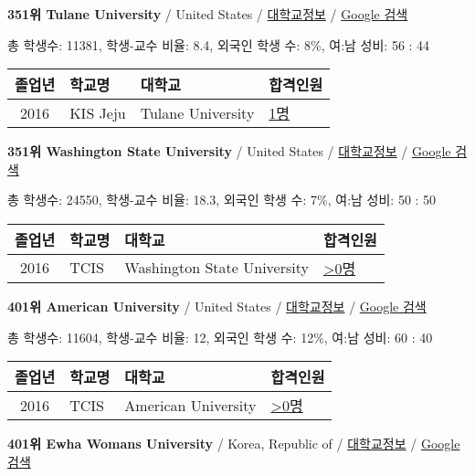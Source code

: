 \documentclass[13pt,]{article}
\begin{document}
\textbf{351위 Tulane University} / United States /
\href{https://www.timeshighereducation.com/world-university-rankings/tulane-university?ranking-dataset=589595}{대학교정보}
/ \href{http://www.google.com/search?q=Tulane+University}{Google 검색}

총 학생수: 11381, 학생-교수 비율: 8.4, 외국인 학생 수: 8\%, 여:남 성비:
56 : 44

\begin{longtable}[]{@{}clll@{}}
\toprule
졸업년 & 학교명 & 대학교 & 합격인원\tabularnewline
\midrule
\endhead
2016 & KIS Jeju & Tulane University &
\href{http://cafe.naver.com/assarabia/11596}{1명}\tabularnewline
\bottomrule
\end{longtable}

\textbf{351위 Washington State University} / United States /
\href{https://www.timeshighereducation.com/world-university-rankings/washington-state-university?ranking-dataset=589595}{대학교정보}
/
\href{http://www.google.com/search?q=Washington+State+University}{Google
검색}

총 학생수: 24550, 학생-교수 비율: 18.3, 외국인 학생 수: 7\%, 여:남 성비:
50 : 50

\begin{longtable}[]{@{}clll@{}}
\toprule
졸업년 & 학교명 & 대학교 & 합격인원\tabularnewline
\midrule
\endhead
2016 & TCIS & Washington State University &
\href{http://cafe.naver.com/assarabia/11598}{\textgreater{}0명}\tabularnewline
\bottomrule
\end{longtable}

\textbf{401위 American University} / United States /
\href{https://www.timeshighereducation.com/world-university-rankings/american-university?ranking-dataset=589595}{대학교정보}
/ \href{http://www.google.com/search?q=American+University}{Google 검색}

총 학생수: 11604, 학생-교수 비율: 12, 외국인 학생 수: 12\%, 여:남 성비:
60 : 40

\begin{longtable}[]{@{}clll@{}}
\toprule
졸업년 & 학교명 & 대학교 & 합격인원\tabularnewline
\midrule
\endhead
2016 & TCIS & American University &
\href{http://cafe.naver.com/assarabia/11598}{\textgreater{}0명}\tabularnewline
\bottomrule
\end{longtable}

\textbf{401위 Ewha Womans University} / Korea, Republic of /
\href{https://www.timeshighereducation.com/world-university-rankings/ewha-womans-university?ranking-dataset=589595}{대학교정보}
/ \href{http://www.google.com/search?q=Ewha+Womans+University}{Google
검색}
\end{document}
